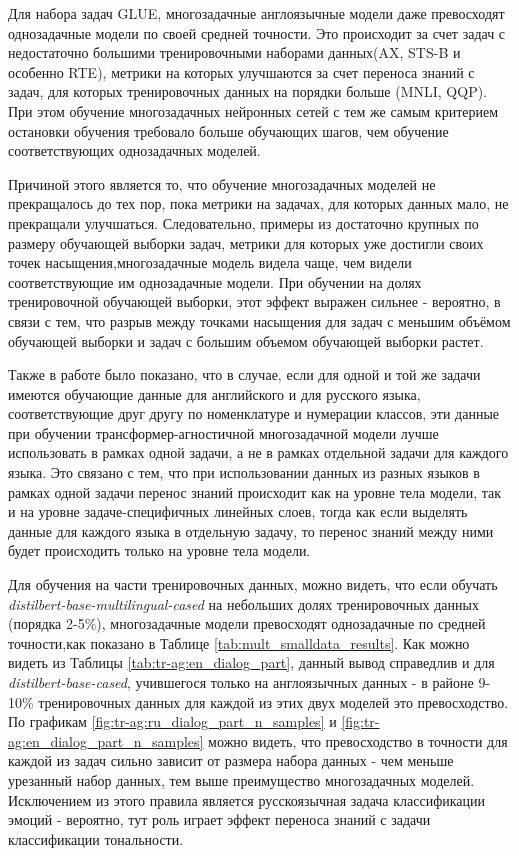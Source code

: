 Для набора задач GLUE, многозадачные англоязычные модели даже превосходят однозадачные модели по своей средней точности. Это происходит за счет задач с недостаточно большими тренировочными наборами данных(AX, STS-B и особенно RTE), метрики на которых улучшаются за счет переноса знаний с задач, для которых тренировочных данных на порядки больше (MNLI, QQP).
При этом обучение многозадачных нейронных сетей с тем же самым критерием остановки обучения требовало больше обучающих шагов, чем обучение соответствующих однозадачных моделей.

Причиной этого является то, что обучение многозадачных моделей не прекращалось до тех пор, пока метрики на задачах, для которых данных мало, не прекращали улучшаться.
Следовательно, примеры из достаточно крупных по размеру обучающей выборки задач, метрики для которых уже достигли своих точек насыщения,многозадачные модель видела чаще, чем видели соответствующие им однозадачные модели. При обучении на долях тренировочной обучающей выборки, этот эффект выражен сильнее - вероятно, в связи с тем, что разрыв между точками насыщения для задач с меньшим объёмом обучающей выборки и задач с большим объемом обучающей выборки растет.

Также в работе было показано, что в случае, если для одной и той же задачи имеются обучающие данные для английского и для русского языка, соответствующие друг другу по номенклатуре и нумерации классов, эти данные при обучении трансформер-агностичной многозадачной модели лучше использовать в рамках одной задачи, а не в рамках отдельной задачи для каждого языка. Это связано с тем, что при использовании данных из разных языков в рамках одной задачи перенос знаний происходит как на уровне тела модели, так и на уровне задаче-специфичных линейных слоев, тогда как если выделять данные для каждого языка в отдельную задачу, то перенос знаний между ними будет происходить только на уровне тела модели.

Для обучения на части тренировочных данных, можно видеть, что если обучать \textit{distilbert-base-multilingual-cased} на небольших долях тренировочных данных (порядка 2-5\%), многозадачные модели превосходят однозадачные по средней точности,как показано в Таблице \ref{tab:mult_smalldata_results}. Как можно видеть из Таблицы \ref{tab:tr-ag:en_dialog_part}, данный вывод справедлив и для \textit{distilbert-base-cased}, учившегося только на англоязычных данных - в районе 9-10\% тренировочных данных для каждой из этих двух моделей это превосходство. По графикам \ref{fig:tr-ag:ru_dialog_part_n_samples} и \ref{fig:tr-ag:en_dialog_part_n_samples} можно видеть, что превосходство в точности для каждой из задач сильно зависит от размера набора данных - чем меньше урезанный набор данных, тем выше преимущество многозадачных моделей. Исключением из этого правила является русскоязычная задача классификации эмоций - вероятно, тут роль играет эффект переноса знаний с задачи классификации тональности.

